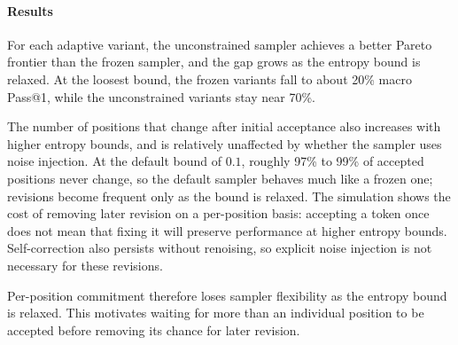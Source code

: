 \paragraph{Results}
For each adaptive variant, the unconstrained sampler achieves a better Pareto frontier than the frozen sampler, and the gap grows as the entropy bound is relaxed.
At the loosest bound, the frozen variants fall to about 20\% macro Pass@1, while the unconstrained variants stay near 70\%.

The number of positions that change after initial acceptance also increases with higher entropy bounds, and is relatively unaffected by whether the sampler uses noise injection.
At the default bound of $0.1$, roughly 97\% to 99\% of accepted positions never change, so the default sampler behaves much like a frozen one; revisions become frequent only as the bound is relaxed.
The simulation shows the cost of removing later revision on a per-position basis: accepting a token once does not mean that fixing it will preserve performance at higher entropy bounds. Self-correction also persists without renoising, so explicit noise injection is not necessary for these revisions.

Per-position commitment therefore loses sampler flexibility as the entropy bound is relaxed. This motivates waiting for more than an individual position to be accepted before removing its chance for later revision.
